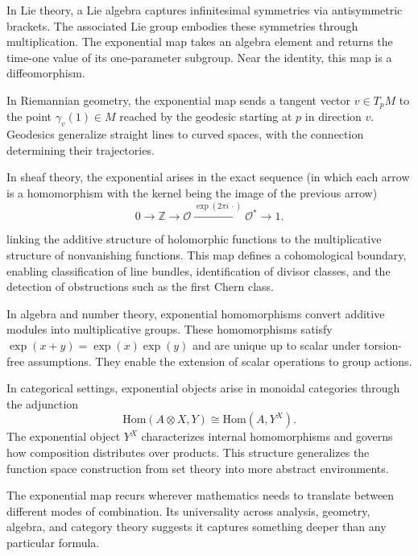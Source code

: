 In Lie theory, a Lie algebra captures infinitesimal symmetries via antisymmetric brackets. The associated Lie group embodies these symmetries through multiplication. The exponential map takes an algebra element and returns the time-one value of its one-parameter subgroup. Near the identity, this map is a diffeomorphism.

In Riemannian geometry, the exponential map sends a tangent vector \( v \in T_p M \) to the point \( \gamma_v(1) \in M \) reached by the geodesic starting at \( p \) in direction \( v \). Geodesics generalize straight lines to curved spaces, with the connection determining their trajectories.

In sheaf theory, the exponential arises in the exact sequence (in which each arrow is a homomorphism with the kernel being the image of the previous arrow)
\[
0 \to \mathbb{Z} \to \mathcal{O} \xrightarrow{\exp(2\pi i\,\cdot)} \mathcal{O}^* \to 1.
\]

linking the additive structure of holomorphic functions to the multiplicative structure of nonvanishing functions. This map defines a cohomological boundary, enabling classification of line bundles, identification of divisor classes, and the detection of obstructions such as the first Chern class.

In algebra and number theory, exponential homomorphisms convert additive modules into multiplicative groups. These homomorphisms satisfy \( \exp(x + y) = \exp(x)\exp(y) \) and are unique up to scalar under torsion-free assumptions. They enable the extension of scalar operations to group actions.

In categorical settings, exponential objects arise in monoidal categories through the adjunction
\[
\mathrm{Hom}(A \otimes X, Y) \cong \mathrm{Hom}(A, Y^X).
\]
The exponential object \( Y^X \) characterizes internal homomorphisms and governs how composition distributes over products. This structure generalizes the function space construction from set theory into more abstract environments.

The exponential map recurs wherever mathematics needs to translate between different modes of combination. Its universality across analysis, geometry, algebra, and category theory suggests it captures something deeper than any particular formula.


